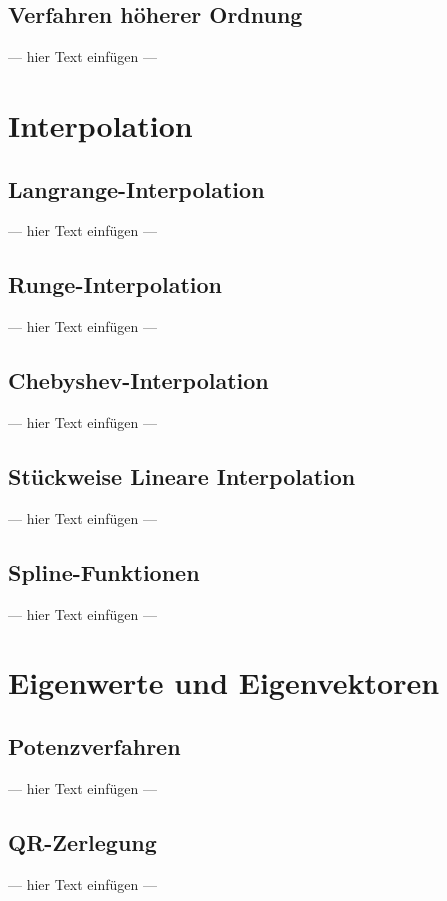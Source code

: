 \documentclass[a4paper, 12pt]{article}
\begin{document}
\subsection{Verfahren höherer Ordnung}
--- hier Text einfügen ---



\section{Interpolation}


\subsection{Langrange-Interpolation}
--- hier Text einfügen ---


\subsection{Runge-Interpolation}
--- hier Text einfügen ---


\subsection{Chebyshev-Interpolation}
--- hier Text einfügen ---


\subsection{Stückweise Lineare Interpolation}
--- hier Text einfügen ---


\subsection{Spline-Funktionen}
--- hier Text einfügen ---



\section{Eigenwerte und Eigenvektoren}


\subsection{Potenzverfahren}
--- hier Text einfügen ---


\subsection{QR-Zerlegung}
--- hier Text einfügen ---
\end{document}
